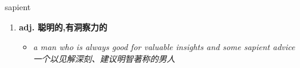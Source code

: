 
\begin{frame}
{\huge sapient}
\begin{center}
\begin{enumerate}\Large
  \item \textbf{adj. 聪明的,有洞察力的}
  \begin{itemize}
    \item \em{\Large{a man who is always good for valuable insights and some sapient advice 一个以见解深刻、建议明智著称的男人}}
  \end{itemize}
\end{enumerate}
\end{center}
\end{frame}
